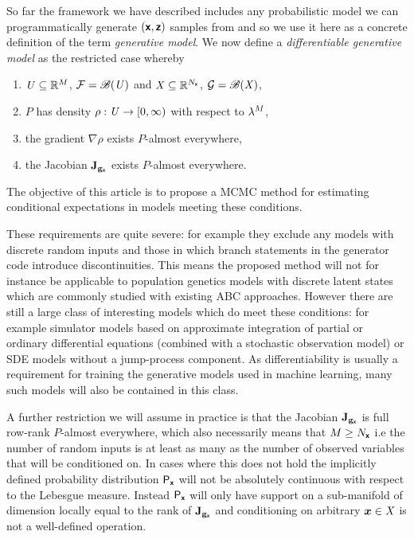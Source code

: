 So far the framework we have described includes any probabilistic model we can programmatically generate $(\boldsymbol{\mathsf{x}},\boldsymbol{\mathsf{z}})$ samples from and so we use it here as a concrete definition of the term \emph{generative model}. We now define a \emph{differentiable generative model} as the restricted case whereby 
\begin{enumerate}
\item
$\mathit{U} \subseteq \mathbb{R}^M$, $\mathcal{F} = \mathscr{B}(\mathit{U})$ and $\mathit{X} \subseteq \mathbb{R}^{N_{\boldsymbol{\mathsf{x}}}}$, $\mathcal{G} = \mathscr{B}(\mathit{X})$, %
\item
$P$ has density $\rho : \mathit{U} \to [0,\infty)$ with respect to $\lebm{M}$, 
\item
the gradient $\nabla\rho$ exists $P$-almost everywhere, 
\item
the Jacobian $\mathbf{J}_{{\mathbf{g}}_{\boldsymbol{\mathsf{x}}}}$ exists $P$-almost everywhere.
\end{enumerate}
The objective of this article is to propose a \ac{MCMC} method for estimating conditional expectations in models meeting these conditions.

These requirements are quite severe: for example they exclude any models with discrete random inputs and those in which branch statements in the generator code introduce discontinuities. This means the proposed method will not for instance be applicable to population genetics models with discrete latent states which are commonly studied with existing \ac{ABC} approaches. However there are still a large class of interesting models which do meet these conditions: for example simulator models based on approximate integration of partial or ordinary differential equations (combined with a stochastic observation model) or \ac{SDE} models without a jump-process component. As differentiability is usually a requirement for training the generative models used in machine learning, many such models will also be contained in this class.

A further restriction we will assume in practice is that the Jacobian $\mathbf{J}_{{\mathbf{g}}_{\boldsymbol{\mathsf{x}}}}$ is full row-rank $P$-almost everywhere, which also necessarily means that $M \geq N_{\boldsymbol{\mathsf{x}}}$ i.e the number of random inputs is at least as many as the number of observed variables that will be conditioned on. In cases where this does not hold the implicitly defined probability distribution $\mathsf{P}_{\boldsymbol{\mathsf{x}}}$ will not be absolutely continuous with respect to the Lebesgue measure. Instead $\mathsf{P}_{\boldsymbol{\mathsf{x}}}$ will only have support on a sub-manifold of dimension locally equal to the rank of $\mathbf{J}_{{\mathbf{g}}_{\boldsymbol{\mathsf{x}}}}$ and conditioning on arbitrary $\boldsymbol{x} \in \mathit{X}$ is not a well-defined operation.


